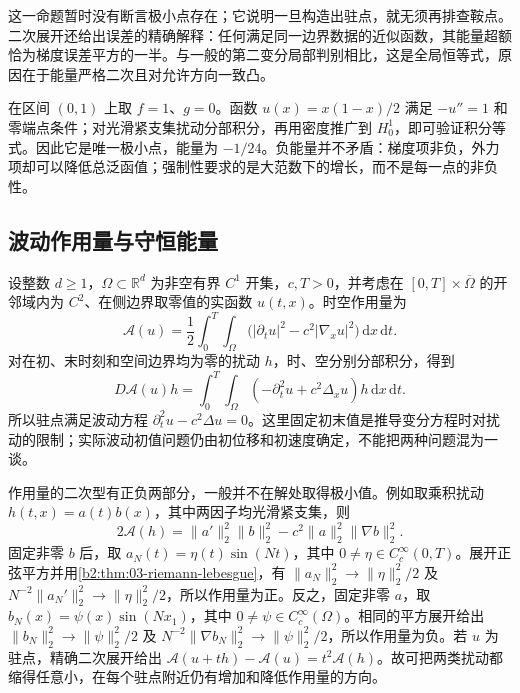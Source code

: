这一命题暂时没有断言极小点存在；它说明一旦构造出驻点，就无须再排查鞍点。二次展开还给出误差的精确解释：任何满足同一边界数据的近似函数，其能量超额恰为梯度误差平方的一半。与一般的第二变分局部判别相比，这是全局恒等式，原因在于能量严格二次且对允许方向一致凸。

\ProseParagraphBreak

在区间 \((0,1)\) 上取 \(f=1\)、\(g=0\)。函数 \(u(x)=x(1-x)/2\) 满足 \(-u''=1\) 和零端点条件；对光滑紧支集扰动分部积分，再用密度推广到 \(H_0^1\)，即可验证积分等式。因此它是唯一极小点，能量为 \(-1/24\)。负能量并不矛盾：梯度项非负，外力项却可以降低总泛函值；强制性要求的是大范数下的增长，而不是每一点的非负性。

\subsection{波动作用量与守恒能量}
\label{b2:subsec:140302}

设整数 \(d\geq1\)，\(\Omega\subset\mathbb R^d\) 为非空有界 \(C^1\) 开集，\(c,T>0\)，并考虑在 \([0,T]\times\overline\Omega\) 的开邻域内为 \(C^2\)、在侧边界取零值的实函数 \(u(t,x)\)。时空作用量为
\[
 \mathcal A(u)=\frac12\int_0^T\int_\Omega
       \bigl(|\partial_tu|^2-c^2|\nabla_xu|^2\bigr)\,\mathrm dx\,\mathrm dt.
\]
对在初、末时刻和空间边界均为零的扰动 \(h\)，时、空分别分部积分，得到
\[
 D\mathcal A(u)h=\int_0^T\int_\Omega
       (-\partial_t^2u+c^2\Delta_xu)h\,\mathrm dx\,\mathrm dt.
\]
所以驻点满足波动方程 \(\partial_t^2u-c^2\Delta u=0\)。这里固定初末值是推导变分方程时对扰动的限制；实际波动初值问题仍由初位移和初速度确定，不能把两种问题混为一谈。

\ProseParagraphBreak

作用量的二次型有正负两部分，一般并不在解处取得极小值。例如取乘积扰动 \(h(t,x)=a(t)b(x)\)，其中两因子均光滑紧支集，则
\[
 2\mathcal A(h)=\lVert a'\rVert_2^2\lVert b\rVert_2^2
      -c^2\lVert a\rVert_2^2\lVert\nabla b\rVert_2^2.
\]
固定非零 \(b\) 后，取 \(a_N(t)=\eta(t)\sin(Nt)\)，其中 \(0\ne\eta\in C_c^\infty(0,T)\)。展开正弦平方并用\cref{b2:thm:03-riemann-lebesgue}，有 \(\|a_N\|_2^2\to\|\eta\|_2^2/2\) 及 \(N^{-2}\|a_N'\|_2^2\to\|\eta\|_2^2/2\)，所以作用量为正。反之，固定非零 \(a\)，取 \(b_N(x)=\psi(x)\sin(Nx_1)\)，其中 \(0\ne\psi\in C_c^\infty(\Omega)\)。相同的平方展开给出 \(\|b_N\|_2^2\to\|\psi\|_2^2/2\) 及 \(N^{-2}\|\nabla b_N\|_2^2\to\|\psi\|_2^2/2\)，所以作用量为负。若 \(u\) 为驻点，精确二次展开给出 \(\mathcal A(u+th)-\mathcal A(u)=t^2\mathcal A(h)\)。故可把两类扰动都缩得任意小，在每个驻点附近仍有增加和降低作用量的方向。

